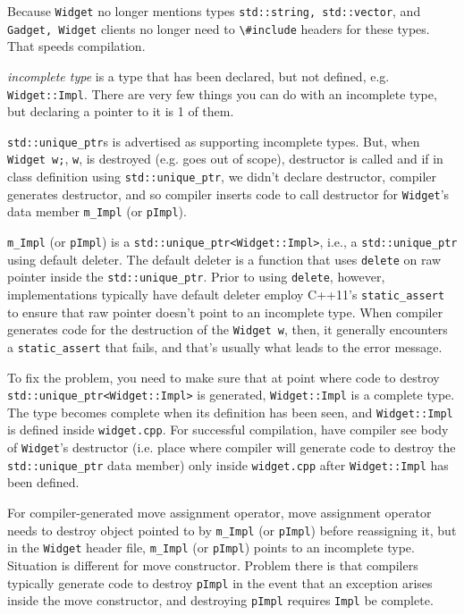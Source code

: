 \documentclass[10pt]{amsart}
\begin{document}
Because \verb|Widget| no longer mentions types \verb|std::string, std::vector|, and \verb|Gadget, Widget| clients no longer need to \verb|\#include| headers for these types.  That speeds compilation.  

\emph{incomplete type} is a type that has been declared, but not defined, e.g. \verb|Widget::Impl|.  There are very few things you can do with an incomplete type, but declaring a pointer to it is 1 of them.  

\verb|std::unique_ptr|s is advertised as supporting incomplete types.  But, when \verb|Widget w;|, \verb|w|, is destroyed (e.g. goes out of scope), destructor is called and if in class definition using \verb|std::unique_ptr|, we didn't declare destructor, compiler generates destructor, and so compiler inserts code to call destructor for \verb|Widget|'s data member \verb|m_Impl| (or \verb|pImpl|).  

\verb|m_Impl| (or \verb|pImpl|) is a \verb|std::unique_ptr<Widget::Impl>|, i.e., a \verb|std::unique_ptr| using default deleter. The default deleter is a function that uses \verb|delete| on raw pointer inside the \verb|std::unique_ptr|.  Prior to using \verb|delete|, however, implementations typically have default deleter employ C++11's \verb|static_assert| to ensure that raw pointer doesn't point to an incomplete type.  When compiler generates code for the destruction of the \verb|Widget w|, then, it generally encounters a \verb|static_assert| that fails, and that's usually what leads to the error message.  

To fix the problem, you need to make sure that at point where code to destroy \verb|std::unique_ptr<Widget::Impl>| is generated, \verb|Widget::Impl| is a complete type.  The type becomes complete when its definition has been seen, and \verb|Widget::Impl| is defined inside \verb|widget.cpp|.  For successful compilation, have compiler see body of \verb|Widget|'s destructor (i.e. place where compiler will generate code to destroy the \verb|std::unique_ptr| data member) only inside \verb|widget.cpp| after \verb|Widget::Impl| has been defined.  

For compiler-generated move assignment operator, move assignment operator needs to destroy object pointed to by \verb|m_Impl| (or \verb|pImpl|) before reassigning it, but in the \verb|Widget| header file, \verb|m_Impl| (or \verb|pImpl|) points to an incomplete type.  Situation is different for move constructor.  Problem there is that compilers typically generate code to destroy \verb|pImpl| in the event that an exception arises inside the move constructor, and destroying \verb|pImpl| requires \verb|Impl| be complete.  
\end{document}
